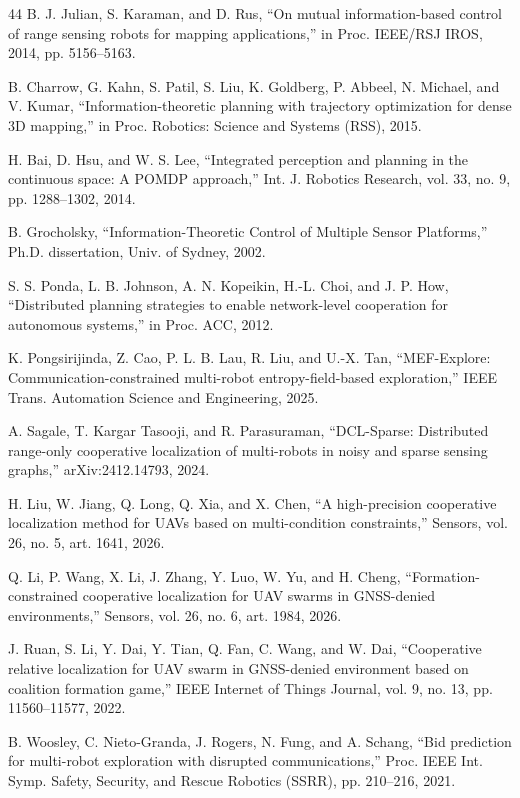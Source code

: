 \documentclass[journal]{IEEEtran}
\begin{document}
\begin{thebibliography}{44}
 B. J. Julian, S. Karaman, and D. Rus, ``On mutual information-based control of range sensing robots for mapping applications,'' in Proc. IEEE/RSJ IROS, 2014, pp. 5156--5163.

 B. Charrow, G. Kahn, S. Patil, S. Liu, K. Goldberg, P. Abbeel, N. Michael, and V. Kumar, ``Information-theoretic planning with trajectory optimization for dense 3D mapping,'' in Proc. Robotics: Science and Systems (RSS), 2015.

 H. Bai, D. Hsu, and W. S. Lee, ``Integrated perception and planning in the continuous space: A POMDP approach,'' Int. J. Robotics Research, vol. 33, no. 9, pp. 1288--1302, 2014.

 B. Grocholsky, ``Information-Theoretic Control of Multiple Sensor Platforms,'' Ph.D. dissertation, Univ. of Sydney, 2002.

 S. S. Ponda, L. B. Johnson, A. N. Kopeikin, H.-L. Choi, and J. P. How, ``Distributed planning strategies to enable network-level cooperation for autonomous systems,'' in Proc. ACC, 2012.

 K. Pongsirijinda, Z. Cao, P. L. B. Lau, R. Liu, and U.-X. Tan, ``MEF-Explore: Communication-constrained multi-robot entropy-field-based exploration,'' IEEE Trans. Automation Science and Engineering, 2025.

 A. Sagale, T. Kargar Tasooji, and R. Parasuraman, ``DCL-Sparse: Distributed range-only cooperative localization of multi-robots in noisy and sparse sensing graphs,'' arXiv:2412.14793, 2024.

 H. Liu, W. Jiang, Q. Long, Q. Xia, and X. Chen, ``A high-precision cooperative localization method for UAVs based on multi-condition constraints,'' Sensors, vol. 26, no. 5, art. 1641, 2026.

 Q. Li, P. Wang, X. Li, J. Zhang, Y. Luo, W. Yu, and H. Cheng, ``Formation-constrained cooperative localization for UAV swarms in GNSS-denied environments,'' Sensors, vol. 26, no. 6, art. 1984, 2026.

 J. Ruan, S. Li, Y. Dai, Y. Tian, Q. Fan, C. Wang, and W. Dai, ``Cooperative relative localization for UAV swarm in GNSS-denied environment based on coalition formation game,'' IEEE Internet of Things Journal, vol. 9, no. 13, pp. 11560--11577, 2022.

 B. Woosley, C. Nieto-Granda, J. Rogers, N. Fung, and A. Schang, ``Bid prediction for multi-robot exploration with disrupted communications,'' Proc. IEEE Int. Symp. Safety, Security, and Rescue Robotics (SSRR), pp. 210--216, 2021.


\end{thebibliography}
\end{document}
